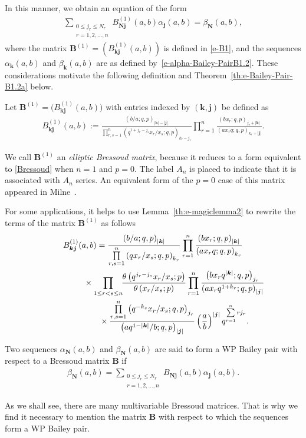 \documentclass[pdftex]{sigma}
\numberwithin{equation}{section}
\newcommand\sumj{{\left| \boldsymbol {j} \right|}}
\newcommand\sumk{{\left| \boldsymbol{k} \right|}}
\newcommand{\B}{{ \mathbf B}}
\newcommand{\N}{{ \boldsymbol N}}
\renewcommand{\k}{{ \boldsymbol{k}}}
\renewcommand{\j}{{ \boldsymbol{j}}}
\newcommand{\multsum}[3]{{\sum\limits_{\substack{{0\le #1_#3 \le #2_#3} \\
{#3 =1,2,\dots, n}}}}}
\newcommand{\triprod}[1]{\prod\limits_{1\le r < s \le #1}}
\newcommand{\sqprod}[1]{\prod\limits_{r, s =1}^{#1}} %
\newcommand{\smallprod}[1]{\prod\limits_{r =1}^{#1}} %
\newcommand{\xover}[1]{#1_{r}/#1_{s}}
\newcommand{\ellipticqrfac}[2]{{\left({#1}; q, p\right)_{#2}}} %
\newcommand{\elliptictheta}[1]{\theta \left({#1} ; p\right) }
\newcommand{\ellipticvandermonde}[3]{\triprod{#3} %
\!\! \frac{\elliptictheta{q^{#2_r-#2_s} \xover {#1} }}{\elliptictheta{\xover{#1}}}
}
\begin{document}
In this manner, we obtain an equation of the form
\begin{gather*}\multsum{j}{N}{r} B^{(1)}_{\N\j}(a, b) \alpha_\j(a,b) =\beta_\N(a,b),
\end{gather*}
where the matrix $\B^{(1)}= (B^{(1)}_{\k\j}(a,b))$ is defined in \eqref{e-B1}, and the sequences $\alpha_\k(a,b)$ and $\beta_\k(a,b)$ are as defined by~\eqref{e-alpha-Bailey-PairB1.2}. These considerations motivate the following definition and Theorem~\ref{th:e-Bailey-Pair-B1.2a} below.

\begin{Definition} Let $\B^{(1)}= \big(B^{(1)}_{\k\j}(a,b)\big)$ with entries indexed by $(\k , \j)$ be defined as
\begin{gather}
B^{(1)}_{\k \j}(a,b) := \frac{\ellipticqrfac{b/a}{\sumk-\sumj}}{ \sqprod n \ellipticqrfac{q^{1+j_r-j_s}\xover x }{k_r-j_r}}
 \smallprod n \frac{\ellipticqrfac{bx_r}{j_r+\sumk}}{\ellipticqrfac{ax_rq}{k_r+\sumj}} .\label{e-B1}
\end{gather}
\end{Definition}
We call $\B^{(1)}$ an \emph{elliptic Bressoud matrix}, because it reduces to a form equivalent to \eqref{Bressoud} when $n=1$ and $p=0$.
The label $A_n$ is placed to indicate that it is associated with $A_n$ series. An equivalent form of the $p=0$ case of this matrix appeared in Milne~\cite[Theorem~3.41]{Milne1997}.

For some applications, it helps to use Lemma~\ref{th:e-magiclemma2} to rewrite the terms of the matrix $\B^{(1)}$ as follows
\begin{gather}
B^{(1)}_{\k\j}(a,b)= \frac
{\ellipticqrfac{b/a}{\sumk }}
{\sqprod n \ellipticqrfac{qx_r/x_s}{k_r}}
\smallprod n \frac{ \ellipticqrfac{bx_r}{\sumk} }{\ellipticqrfac{ax_rq}{k_r}}\nonumber\\
\hphantom{B^{(1)}_{\k\j}(a,b)=}{}\times \ellipticvandermonde{x}{j}{n} \smallprod n \frac{ \ellipticqrfac{bx_rq^{\sumk}}{j_r}} { \ellipticqrfac{ax_rq^{1+k_r}}{\sumj}} \nonumber\\
\hphantom{B^{(1)}_{\k\j}(a,b)=}{} \times \frac
{\sqprod n \ellipticqrfac{q^{-k_s}\xover{x}}{j_r}}
{\ellipticqrfac{aq^{1-\sumk}/b}{\sumj}}
 \left(\frac{a}{b}\right)^{\sumj} q^{\sum\limits_{r=1}^n r j_r} .\label{e-B1-form2}
\end{gather}

\begin{Definition} Two sequences $\alpha_\N(a,b)$ and $\beta_\N(a,b)$ are said to form a WP Bailey pair with respect to a Bressoud matrix $\B$ if
\begin{gather} \label{BaileyPair-def}
\beta_\N(a,b) = \multsum{j}{N}{r} B_{\N\j}(a,b) \alpha_{\j} (a,b) .
\end{gather}
\end{Definition}
As we shall see, there are many multivariable Bressoud matrices. That is why we find it necessary to mention the matrix $\B$ with respect to which the sequences form a WP Bailey pair.
\end{document}
